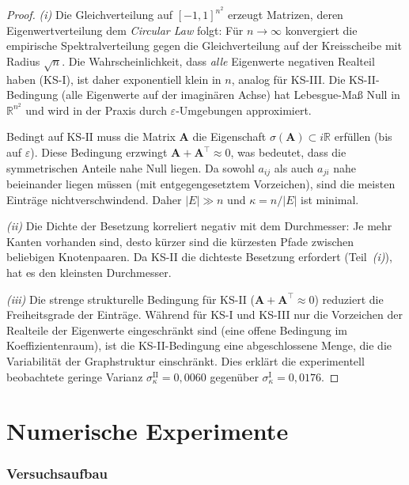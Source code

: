 ﻿\documentclass[12pt, a4paper, titlepage]{report}
\theoremstyle{definition}
\theoremstyle{remark}
\newcommand{\R}{\mathbb{R}}
\newcommand{\vA}{\bm{A}}
\newcommand{\T}{\top}
\newcommand{\spec}{\sigma}
\newcommand{\KS}{\mathrm{KS}}
\begin{document}
\begin{proof}
\textit{(i)} Die Gleichverteilung auf $[-1,1]^{n^2}$ erzeugt Matrizen, deren
Eigenwertverteilung dem \emph{Circular Law} folgt: Für $n \to \infty$ konvergiert
die empirische Spektralverteilung gegen die Gleichverteilung auf der Kreisscheibe
mit Radius $\sqrt{n}$. Die Wahrscheinlichkeit, dass \emph{alle} Eigenwerte
negativen Realteil haben (KS-I), ist daher exponentiell klein in $n$, analog
für KS-III. Die KS-II-Bedingung (alle Eigenwerte auf der imaginären Achse) hat
Lebesgue-Maß Null in $\R^{n^2}$ und wird in der Praxis durch $\varepsilon$-Umgebungen
approximiert.

Bedingt auf $\KS\text{-II}$ muss die Matrix $\vA$ die Eigenschaft
$\spec(\vA) \subset i\R$ erfüllen (bis auf $\varepsilon$). Diese Bedingung erzwingt
$\vA + \vA^\T \approx 0$, was bedeutet, dass die symmetrischen Anteile nahe Null
liegen. Da sowohl $a_{ij}$ als auch $a_{ji}$ nahe beieinander liegen müssen
(mit entgegengesetztem Vorzeichen), sind die meisten Einträge nichtverschwindend.
Daher $|E| \gg n$ und $\kappa = n/|E|$ ist minimal.

\textit{(ii)} Die Dichte der Besetzung korreliert negativ mit dem Durchmesser:
Je mehr Kanten vorhanden sind, desto kürzer sind die kürzesten Pfade zwischen
beliebigen Knotenpaaren. Da KS-II die dichteste Besetzung erfordert
(Teil~\textit{(i)}), hat es den kleinsten Durchmesser.

\textit{(iii)} Die strenge strukturelle Bedingung für KS-II ($\vA + \vA^\T \approx 0$)
reduziert die Freiheitsgrade der Einträge. Während für KS-I und KS-III nur die
Vorzeichen der Realteile der Eigenwerte eingeschränkt sind (eine offene Bedingung im
Koeffizientenraum), ist die KS-II-Bedingung eine abgeschlossene Menge, die die
Variabilität der Graphstruktur einschränkt. Dies erklärt die experimentell beobachtete
geringe Varianz $\sigma_\kappa^{\mathrm{II}} = 0{,}0060$ gegenüber
$\sigma_\kappa^{\mathrm{I}} = 0{,}0176$.
\end{proof}

\section{Numerische Experimente}

\subsubsection{Versuchsaufbau}
\end{document}
